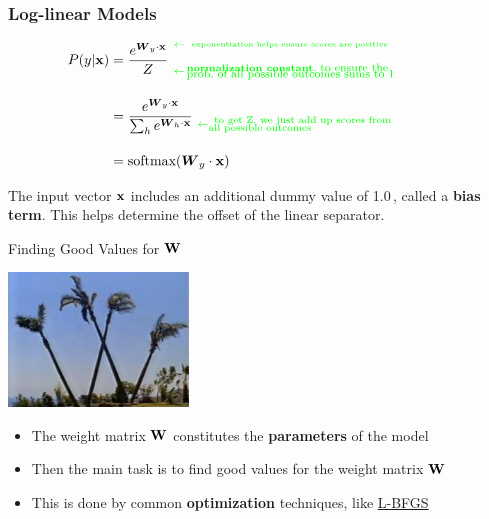 \documentclass[xcolor=pdftex,x11names,table,hyperref]{beamer}
\begin{document}
\begin{frame}[fragile]\frametitle{Log-linear Models}
	\begin{Large}
	\begin{align}
		P(y | \mathbf{x}) & = \frac{e^{\boldsymbol W_y \cdot \mathbf{x}} }{Z} \hspace*{0.4em} \substack{\color{green}{ \leftarrow \, \text{\parbox[c]{0.55\textwidth}{ {\tiny \, exponentiation helps ensure scores are positive}}}} \\[1.0em]  \color{green}{ \leftarrow \, \text{\parbox[c]{0.55\textwidth}{ \textbf{normalization constant}, {\footnotesize to ensure the \\[-0.9em] prob.\ of all possible outcomes sums to 1}}}}}  \nonumber\\[1.0em]
							& =	\frac{e^{\boldsymbol W_y \cdot \mathbf{x}}}{\sum_h e^{\boldsymbol W_h \cdot \mathbf{x}}}  \,\, \substack{ \, \\[1.0em]  \color{green}{ \leftarrow \text{\parbox[c]{0.50\textwidth}{ \, to get Z, we just add up scores from \\[-0.8em] all possible outcomes}}}} \nonumber\\[1.0em]
							& = \text{softmax}(\boldsymbol W_y \cdot \mathbf{x}) \nonumber%
	\end{align}
	\end{Large}
	\pause

	The input vector $\bf x$ includes an additional dummy value of 1.0\,, called a \textbf{bias term}.
	This helps determine the offset of the linear separator.  %
\end{frame}


\begin{frame}{Finding Good Values for $\bf W$}
	\begin{center}
	\includegraphics[width=0.36\textwidth]{images/big-w.jpg}
	\end{center}
\begin{itemize}
	\item The weight matrix $\bf W$ constitutes the \textbf{parameters} of the model
	\item Then the main task is to find good values for the weight matrix $\bf W$
	\item This is done by common \textbf{optimization} techniques, like \href{https://en.wikipedia.org/wiki/Limited-memory_BFGS}{L-BFGS}
\end{itemize}
\end{frame}
\end{document}
